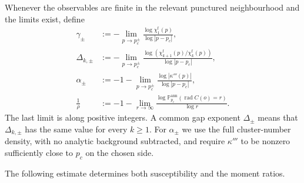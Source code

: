 \begin{definition}\label{def:other-exponents}
Whenever the observables are finite in the relevant punctured neighbourhood and the limits exist, define
\begin{align*}
 \gamma_\pm&:=-\lim_{p\to p_c^\pm}
 \frac{\log\chi_1^{\mathrm f}(p)}{\log|p-p_c|},\\
 \Delta_{k,\pm}&:=-\lim_{p\to p_c^\pm}
 \frac{\log(\chi_{k+1}^{\mathrm f}(p)/\chi_k^{\mathrm f}(p))}{\log|p-p_c|},\\
 \alpha_\pm&:=-1-\lim_{p\to p_c^\pm}
 \frac{\log|\kappa'''(p)|}{\log|p-p_c|},\\
 \frac1\rho&:=-1-\lim_{r\to\infty}
 \frac{\log\mathbb P_{p_c}^{\mathrm{ann}}(\operatorname{rad}C(o)=r)}{\log r}.
\end{align*}
The last limit is along positive integers.
A common gap exponent $\Delta_\pm$ means that $\Delta_{k,\pm}$ has the same value for every $k\ge1$.
For $\alpha_\pm$ we use the full cluster-number density, with no analytic background subtracted, and require $\kappa'''$ to be nonzero sufficiently close to $p_c$ on the chosen side.
\end{definition}

The following estimate determines both susceptibility and the moment ratios.

